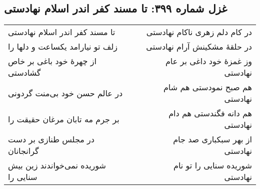 \begin{center}
\section*{غزل شماره ۳۹۹: تا مسند کفر اندر اسلام نهادستی}
\label{sec:399}
\begin{longtable}{l p{0.5cm} r}
تا مسند کفر اندر اسلام نهادستی
&&
در کام دلم زهری ناکام نهادستی
\\
زلف تو نیارامد یکساعت و دلها را
&&
در حلقهٔ مشکینش آرام نهادستی
\\
از چهرهٔ خود باغی بر خاص گشادستی
&&
وز غمزهٔ خود داغی بر عام نهادستی
\\
در عالم حسن خود بی‌منت گردونی
&&
هم صبح نمودستی هم شام نهادستی
\\
بر جرم مه تابان مرغان حقیقت را
&&
هم دانه فگندستی هم دام نهادستی
\\
در مجلس طنازی بر دست گرانجانان
&&
از بهر سبکباری صد جام نهادستی
\\
شوریده نمی‌خواندند زین بیش سنایی را
&&
شوریده سنایی را تو نام نهادستی
\\
\end{longtable}
\end{center}
